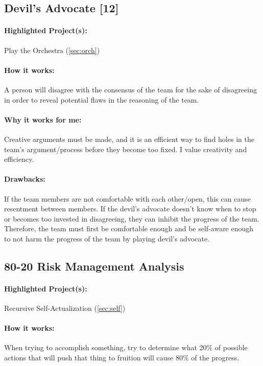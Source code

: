\documentclass[a4paper,12pt]{article}
\begin{document}
\subsection{Devil’s Advocate [12]}
\label{sec:devil}
\paragraph{Highlighted Project(s): } Play the Orchestra (\ref{sec:orch})

\paragraph{How it works: }
A person will disagree with the consensus of the team for the sake of disagreeing in order to reveal potential flaws in the reasoning of the team.

\paragraph{Why it works for me: }
Creative arguments must be made, and it is an efficient way to find holes in the team’s argument/process before they become too fixed. I value creativity and efficiency.

\paragraph{Drawbacks: }
If the team members are not comfortable with each other/open, this can cause resentment between members. If the devil’s advocate doesn’t know when to stop or becomes too invested in disagreeing, they can inhibit the progress of the team. Therefore, the team must first be comfortable enough and be self-aware enough to not harm the progress of the team by playing devil’s advocate.

\subsection{80-20 Risk Management Analysis}
\paragraph{Highlighted Project(s): } Recursive Self-Actualization (\ref{sec:self})

\paragraph{How it works: }
When trying to accomplish something, try to determine what 20\% of possible actions that will push that thing to fruition will cause 80\% of the progress.
\end{document}
